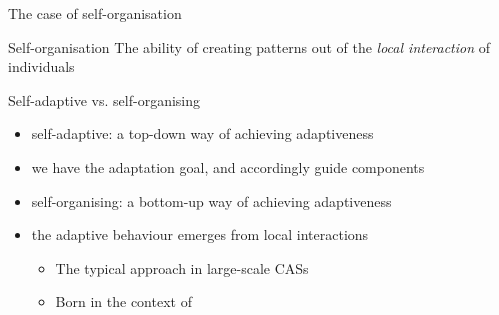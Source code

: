 \documentclass[presentation, 9pt]{beamer}\mode<presentation>{\usetheme{AMSBolognaFC}}
\begin{document}
\begin{frame}{The case of self-organisation}
\begin{alertblock}{Self-organisation}
	\centering
	The ability of creating  patterns out of the \emph{local interaction} of individuals
\end{alertblock}
\begin{exampleblock}{Self-adaptive vs. self-organising}
\begin{itemize}
	\item self-adaptive: a top-down way of achieving adaptiveness
	\item[\faArrowRight] we have the adaptation goal, and accordingly guide components 
	\item self-organising: a bottom-up way of achieving adaptiveness
	\item[\faArrowRight] the adaptive behaviour emerges from local interactions
	\begin{itemize}
		\item The typical approach in large-scale CASs
		\item Born in the context of 
	\end{itemize}
\end{itemize}
\end{exampleblock}
\end{frame}
\end{document}
